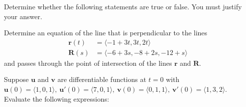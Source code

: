 \documentclass[12pt, addpoints]{exam/exam}
\newcommand{\vect}[1]{\mathbf{#1}}
\newcommand{\R}{\mathbb R}
\newcommand{\vstr}{\vspace{\stretch{1}}}
\theoremstyle{plain}
\begin{document}
\begin{questions}
\thispagestyle{headandfoot}

\question %
Determine whether the following statements are true or false.  You must justify your answer.  
\vstr 

\newpage
\question[18] %
Determine an equation of the line that is perpendicular to the lines 
\begin{align*}
\vect r(t) &= \langle -1+3t,3t,2t\rangle \\
\vect R(s) &= \langle -6+3s,-8+2s,-12+s\rangle 
\end{align*}
and passes through the point of intersection of the lines $\vect r$ and $\vect R$.


\newpage
\question %
Suppose $\vect u$ and $\vect v$ are differentiable functions at $t=0$ with $\vect u(0)=\langle 1,0,1\rangle,\ \vect u'(0)=\langle 7,0,1\rangle,\ \vect v(0)=\langle 0,1,1\rangle,\ \vect v'(0)=\langle 1,3,2\rangle$.  Evaluate the following expressions:
\begin{parts}

\end{parts}
\end{questions}
\end{document}
